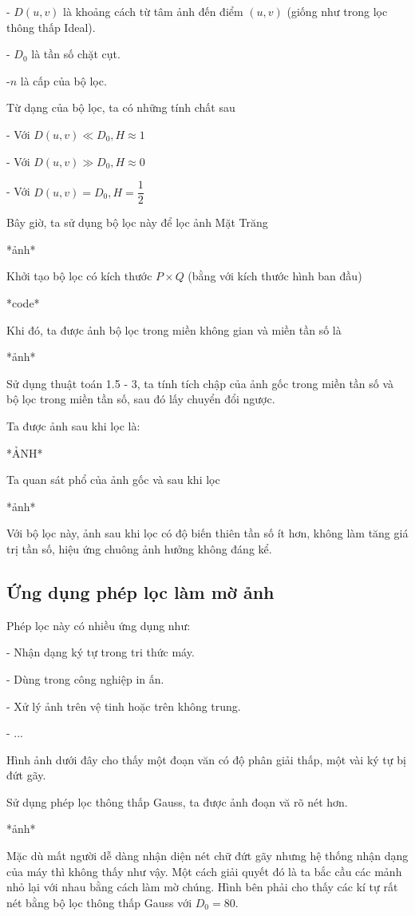 \documentclass[12pt,a4paper]{report}
\numberwithin{equation}{section}
\theoremstyle{definition} %
\begin{document}
- $D(u,v)$ là khoảng cách từ tâm ảnh đến điểm $(u,v)$ (giống như trong lọc thông thấp Ideal).

- $D_0$ là tần số chặt cụt.

-$n$ là cấp của bộ lọc.

Từ dạng của bộ lọc, ta có những tính chất sau

- Với $D(u,v) \ll D_0, H\approx 1$

- Với $D(u,v) \gg D_0, H\approx 0$

- Với $D(u,v) = D_0, H= \dfrac{1}{2}$

Bây giờ, ta sử dụng bộ lọc này để lọc ảnh Mặt Trăng

*ảnh*

Khởi tạo bộ lọc có kích thước $P \times Q$ (bằng với kích thước hình ban đầu)

*code*

Khi đó, ta được ảnh bộ lọc trong miền không gian và miền tần số là 

*ảnh*

Sử dụng thuật toán 1.5 - 3, ta tính tích chập của ảnh gốc trong miền tần số và bộ lọc trong miền tần số, sau đó lấy chuyển đổi ngược.

Ta được ảnh sau khi lọc là:

*ẢNH*

Ta quan sát phổ của ảnh gốc và sau khi lọc 

*ảnh*

Với bộ lọc này, ảnh sau khi lọc có độ biến thiên tần số ít hơn, không làm tăng giá trị tần số, hiệu ứng chuông ảnh hưởng không đáng kể. 



\subsection{Ứng dụng phép lọc làm mờ ảnh}

Phép lọc này có nhiều ứng dụng như:

- Nhận dạng ký tự trong tri thức máy.

- Dùng trong công nghiệp in ấn.

- Xử lý ảnh trên vệ tinh hoặc trên không trung.

- ...

Hình ảnh dưới đây cho thấy một đoạn văn có độ phân giải thấp, một vài ký tự bị đứt gãy. 

Sử dụng phép lọc thông thấp Gauss, ta được ảnh đoạn vă rõ nét hơn.

*ảnh*

Mặc dù mất người dễ dàng nhận diện nét chữ đứt gãy nhưng hệ thống nhận dạng của máy thì không thấy như vậy. Một cách giải quyết đó là ta bắc cầu các mảnh nhỏ lại với nhau bằng cách làm mờ chúng. Hình bên phải cho thấy các kí tự rất nét bằng bộ lọc thông thấp Gauss với $D_0 = 80$.
\end{document}
